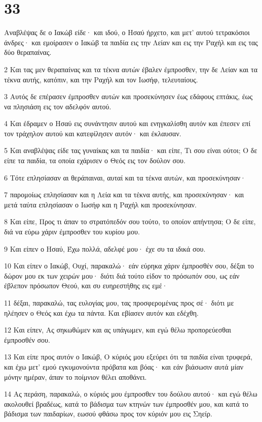 \chapter{33}

\par Αναβλέψας δε ο Ιακώβ είδε· και ιδού, ο Ησαύ ήρχετο, και μετ' αυτού τετρακόσιοι άνδρες· και εμοίρασεν ο Ιακώβ τα παιδία εις την Λείαν και εις την Ραχήλ και εις τας δύο θεραπαίνας.
\par 2 Και τας μεν θεραπαίνας και τα τέκνα αυτών έβαλεν έμπροσθεν, την δε Λείαν και τα τέκνα αυτής, κατόπιν, και την Ραχήλ και τον Ιωσήφ, τελευταίους.
\par 3 Αυτός δε επέρασεν έμπροσθεν αυτών και προσεκύνησεν έως εδάφους επτάκις, έως να πλησιάση εις τον αδελφόν αυτού.
\par 4 Και έδραμεν ο Ησαύ εις συνάντησιν αυτού και ενηγκαλίσθη αυτόν και έπεσεν επί τον τράχηλον αυτού και κατεφίλησεν αυτόν· και έκλαυσαν.
\par 5 Και αναβλέψας είδε τας γυναίκας και τα παιδία· και είπε, Τι σου είναι ούτοι; Ο δε είπε τα παιδία, τα οποία εχάρισεν ο Θεός εις τον δούλον σου.
\par 6 Τότε επλησίασαν αι θεράπαιναι, αυταί και τα τέκνα αυτών, και προσεκύνησαν·
\par 7 παρομοίως επλησίασαν και η Λεία και τα τέκνα αυτής, και προσεκύνησαν· και μετά ταύτα επλησίασαν ο Ιωσήφ και η Ραχήλ και προσεκύνησαν.
\par 8 Και είπε, Προς τι άπαν το στρατόπεδόν σου τούτο, το οποίον απήντησα; Ο δε είπε, διά να εύρω χάριν έμπροσθεν του κυρίου μου.
\par 9 Και είπεν ο Ησαύ, Έχω πολλά, αδελφέ μου· έχε συ τα ιδικά σου.
\par 10 Και είπεν ο Ιακώβ, Ουχί, παρακαλώ· εάν εύρηκα χάριν έμπροσθέν σου, δέξαι το δώρον μου εκ των χειρών μου· διότι διά τούτο είδον το πρόσωπόν σου, ως εάν έβλεπον πρόσωπον Θεού, και συ ευηρεστήθης εις εμέ·
\par 11 δέξαι, παρακαλώ, τας ευλογίας μου, τας προσφερομένας προς σέ· διότι με ηλέησεν ο Θεός και έχω τα πάντα. Και εβίασεν αυτόν και εδέχθη.
\par 12 Και είπεν, Ας σηκωθώμεν και ας υπάγωμεν, και εγώ θέλω προπορεύεσθαι έμπροσθέν σου.
\par 13 Και είπε προς αυτόν ο Ιακώβ, Ο κύριός μου εξεύρει ότι τα παιδία είναι τρυφερά, και έχω μετ' εμού εγκυμονούντα πρόβατα και βόας· και εάν βιάσωσιν αυτά μίαν μόνην ημέραν, άπαν το ποίμνιον θέλει αποθάνει.
\par 14 Ας περάση, παρακαλώ, ο κύριός μου έμπροσθεν του δούλου αυτού· και εγώ θέλω ακολουθεί βραδέως, κατά το βάδισμα των κτηνών των έμπροσθέν μου, και κατά το βάδισμα των παιδαρίων, εωσού φθάσω προς τον κύριόν μου εις Σηείρ.
